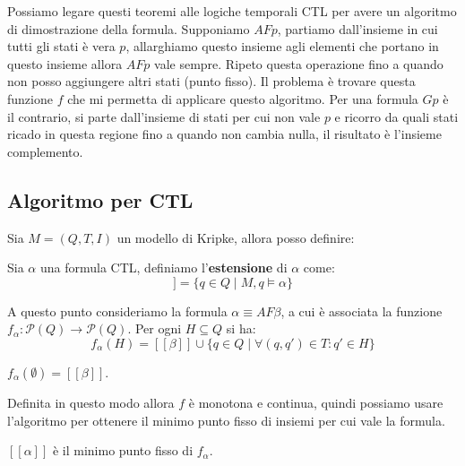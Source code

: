 Possiamo legare questi teoremi alle logiche temporali CTL per avere un algoritmo
di dimostrazione della formula. Supponiamo $AFp$, partiamo dall'insieme in cui
tutti gli stati è vera $p$, allarghiamo questo insieme agli elementi che portano in
questo insieme allora $AFp$ vale sempre. Ripeto questa operazione fino a quando
non posso aggiungere altri stati (punto fisso). Il problema è trovare questa
funzione $f$ che mi permetta di applicare questo algoritmo. Per una formula $Gp$
è il contrario, si parte dall'insieme di stati per cui non vale $p$ e ricorro da
quali stati ricado in questa regione fino a quando non cambia nulla, il risultato
è l'insieme complemento.
\subsection{Algoritmo per CTL}
Sia $M=(Q,T,I)$ un modello di Kripke, allora posso definire:
\begin{definizione}
    Sia $\alpha$ una formula CTL, definiamo l'\textbf{estensione} di $\alpha$ come:
    \begin{equation}
        [[\alpha]] = \{q \in Q \mid M, q \models \alpha\}
    \end{equation}
\end{definizione}
A questo punto consideriamo la formula $\alpha \equiv A F \beta$, a cui è associata
la funzione $f_\alpha: \mathcal{P}(Q) \to \mathcal{P}(Q)$. Per ogni $H \subseteq Q$
si ha:
\begin{equation}
    f_\alpha(H) = [[\beta]] \cup \{q \in Q \mid \forall(q, q') \in T: q ' \in H\}
\end{equation}
\begin{osservazione}
    $f_\alpha (\emptyset) = [[\beta]]$.
\end{osservazione}
Definita in questo modo allora $f$ è monotona e continua, quindi possiamo usare
l'algoritmo per ottenere il minimo punto fisso di insiemi per cui vale la formula.
\begin{center}
    $[[\alpha]]$ è il minimo punto fisso di $f_\alpha$.
\end{center}

